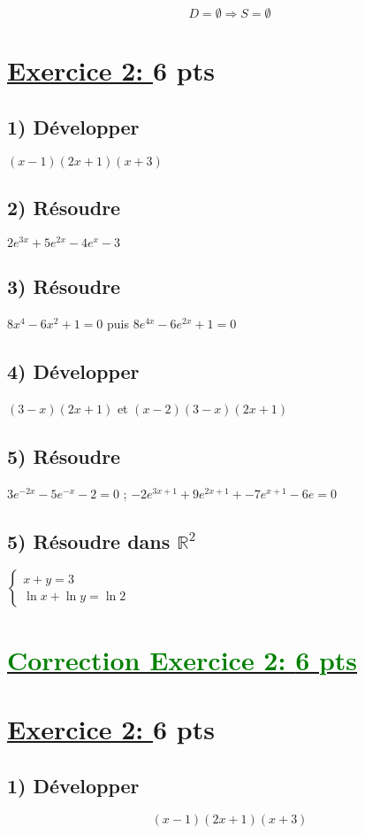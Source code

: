 \documentclass[12pt]{article}
\begin{document}
\[
D = \emptyset \Longrightarrow S = \emptyset
\]

\section*{\underline{Exercice 2: }\textbf{6 pts}}
\subsection*{ 1) Développer } $(x-1)(2x+1)(x+3)$
\subsection*{ 2) Résoudre } $2e^{3x}+5e^{2x}-4e^{x}-3$
\subsection*{ 3) Résoudre } $8x^{4}-6x^{2}+1=0$ puis $8e^{4x}-6e^{2x}+1=0$
\subsection*{ 4) Développer } $(3-x)(2x+1)$ et $(x-2)(3-x)(2x+1)$
\subsection*{ 5) Résoudre } $3e^{-2x}-5e^{-x}-2=0$ ; $-2e^{3x+1}+9e^{2x+1}+-7e^{x+1}-6e=0$
\subsection*{ 5) Résoudre dans $\mathbb{R}^{2}$} 
\( \begin{cases}
x + y = 3 \\
\ln x + \ln y = \ln 2
\end{cases}\)
\section*{\underline{\textcolor{green}{Correction Exercice 2: \textbf{6 pts}}}}

\section*{\underline{Exercice 2: }\textbf{6 pts}}

\subsection*{1) Développer } 
\[
(x-1)(2x+1)(x+3)
\]
\end{document}
